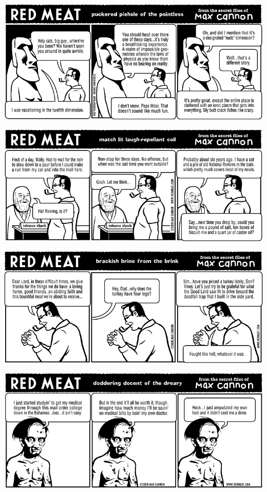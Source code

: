 \documentclass[a4paper,twoside,11pt]{article}
\begin{document}
\includegraphics[width=\textwidth]{redmeat_2008-11-18.png}



\includegraphics[width=\textwidth]{redmeat_2008-11-25.png}



\includegraphics[width=\textwidth]{redmeat_2008-12-02.png}



\includegraphics[width=\textwidth]{redmeat_2008-12-09.png}
\end{document}
